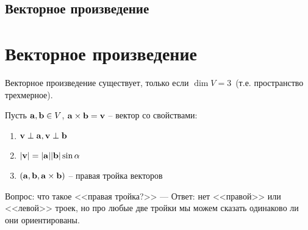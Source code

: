\section{Векторное произведение}

\chapter{Векторное произведение}
\begin{remark}
    Векторное произведение существует, только если $\dim V = 3$~(т.е. пространство
    трехмерное).
\end{remark}

\begin{definition}[Формальное]
    Пусть $\mathbf{a}, \mathbf{b} \in V$, $\mathbf{a} \times \mathbf{b} = \mathbf{v}$ -- вектор со свойствами:
    \begin{enumerate}
        \item $\mathbf{v} \perp \mathbf{a}, \mathbf{v} \perp \mathbf{b}$
        \item $|\mathbf{v}| = |\mathbf{a}| |\mathbf{b}| \sin \alpha$
        \item $(\mathbf{a}, \mathbf{b}, \mathbf{a} \times \mathbf{b})$ -- правая тройка векторов
    \end{enumerate}
\end{definition}

Вопрос: что такое <<правая тройка?>> --- Ответ: нет <<правой>> или <<левой>> троек,
но про любые две тройки мы можем сказать одинаково ли они ориентированы.

